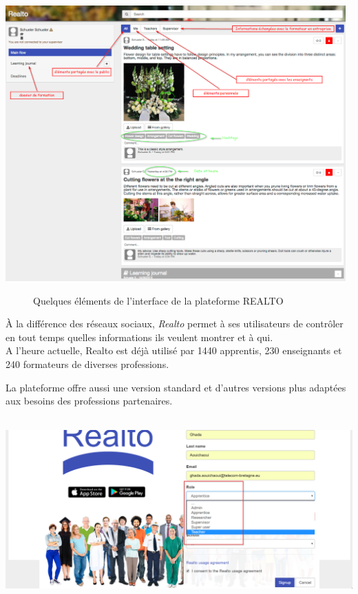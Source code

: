 \documentclass{report}
\begin{document}
\begin{center}
\includegraphics[height=300pt]{REALTO.png}
\end{center}
\begin{figure}[H]
    \centering
    \caption{Quelques éléments de l'interface de la plateforme REALTO}
    \label{fig:REALTO}
\end{figure}

À la différence des réseaux sociaux, \emph{Realto} permet à ses utilisateurs de contrôler en tout temps quelles informations ils veulent montrer et à qui.\\

\og A l’heure actuelle, Realto est déjà utilisé par 1440 apprentis, 230 enseignants et 240 formateurs de diverses professions.\fg \cite{ref8}

La plateforme offre aussi une version standard et d'autres versions plus adaptées aux besoins des professions partenaires.\\
\begin{center}
\includegraphics[height=200pt]{RoleLimite.png}
\end{center}
\end{document}
